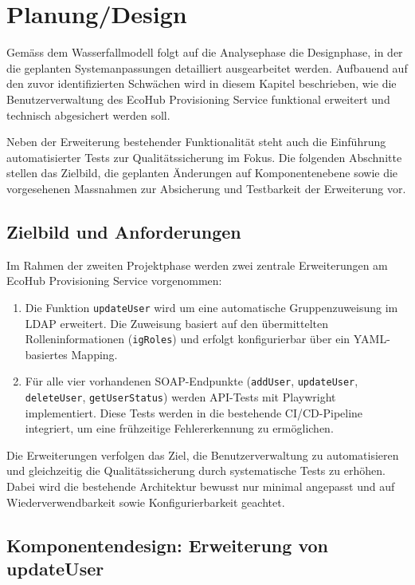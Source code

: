 \chapter{Planung/Design}
\vspace{-3em}


Gemäss dem Wasserfallmodell folgt auf die Analysephase die Designphase, in der die geplanten Systemanpassungen detailliert ausgearbeitet werden. Aufbauend auf den zuvor identifizierten Schwächen wird in diesem Kapitel beschrieben, wie die Benutzerverwaltung des EcoHub Provisioning Service funktional erweitert und technisch abgesichert werden soll.

Neben der Erweiterung bestehender Funktionalität steht auch die Einführung automatisierter Tests zur Qualitätssicherung im Fokus. Die folgenden Abschnitte stellen das Zielbild, die geplanten Änderungen auf Komponentenebene sowie die vorgesehenen Massnahmen zur Absicherung und Testbarkeit der Erweiterung vor.

\section{Zielbild und Anforderungen}
\label{sec:zielbild}

Im Rahmen der zweiten Projektphase werden zwei zentrale Erweiterungen am EcoHub Provisioning Service vorgenommen:

\begin{enumerate}
    \item Die Funktion \texttt{updateUser} wird um eine automatische Gruppenzuweisung im LDAP erweitert. Die Zuweisung basiert auf den übermittelten Rolleninformationen (\texttt{igRoles}) und erfolgt konfigurierbar über ein YAML-basiertes Mapping.
    
    \item Für alle vier vorhandenen SOAP-Endpunkte (\texttt{addUser}, \texttt{updateUser}, \texttt{deleteUser}, \texttt{getUserStatus}) werden API-Tests mit Playwright implementiert. Diese Tests werden in die bestehende CI/CD-Pipeline integriert, um eine frühzeitige Fehlererkennung zu ermöglichen.
\end{enumerate}

Die Erweiterungen verfolgen das Ziel, die Benutzerverwaltung zu automatisieren und gleichzeitig die Qualitätssicherung durch systematische Tests zu erhöhen. Dabei wird die bestehende Architektur bewusst nur minimal angepasst und auf Wiederverwendbarkeit sowie Konfigurierbarkeit geachtet.

\section{Komponentendesign: Erweiterung von updateUser}
\label{sec:komponenten}

